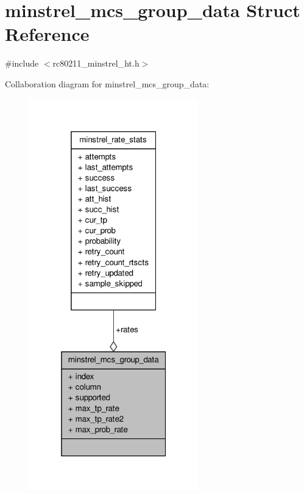 \hypertarget{structminstrel__mcs__group__data}{\section{minstrel\-\_\-mcs\-\_\-group\-\_\-data Struct Reference}
\label{structminstrel__mcs__group__data}
}


{\ttfamily \#include $<$rc80211\-\_\-minstrel\-\_\-ht.\-h$>$}



Collaboration diagram for minstrel\-\_\-mcs\-\_\-group\-\_\-data\-:
\nopagebreak
\begin{figure}[H]
\begin{center}
\leavevmode
\includegraphics[width=208pt]{structminstrel__mcs__group__data__coll__graph}
\end{center}
\end{figure}
